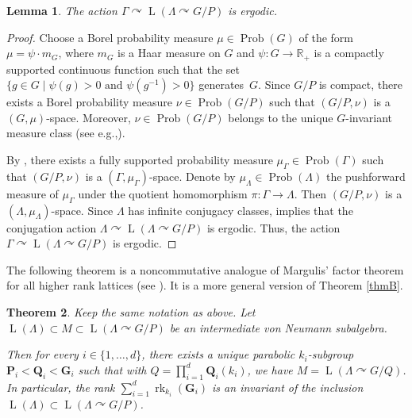 \documentclass[11pt]{article}
\newcommand{\eg}{e.g.,\xspace}
\newcommand{\bG}{\boldsymbol{G}}
\newcommand{\bP}{\boldsymbol{P}}
\newcommand{\bQ}{\boldsymbol{Q}}
\newtheorem{thm}{Theorem}[section]
\newtheorem{lem}[thm]{Lemma}
\theoremstyle{definition}
\newcommand{\R}{\mathbb{R}}
\DeclareMathOperator{\Prob}{Prob}
\DeclareMathOperator{\rk}{rk}
\DeclareMathOperator{\rL}{L}
\begin{document}
\begin{lem}\label{lem-conjugation}
The action $\Gamma \curvearrowright \rL(\Lambda \curvearrowright G/P)$ is ergodic.
\end{lem}

\begin{proof}
Choose a Borel probability measure $\mu \in \Prob(G)$ of the form $\mu = \psi \cdot m_G$, where $m_G$ is a Haar measure on $G$ and $\psi : G \to \R_+$ is a compactly supported continuous function such that the set $\{g \in G \mid \psi(g) > 0 \text{ and } \psi(g^{-1}) > 0\}$ generates~$G$. Since $G/P$ is compact, there exists a Borel probability measure $\nu \in \Prob(G/P)$ such that $(G/P, \nu)$ is a $(G, \mu)$-space. Moreover, $\nu\in \Prob(G/P)$ belongs to the unique $G$-invariant measure class (see \eg \cite[Lem.\,1.1]{NZ97}).

By \cite[Prop.\,VI.4.1]{Ma91}, there exists a fully supported probability measure $\mu_\Gamma \in \Prob(\Gamma)$ such that $(G/P, \nu)$ is a $(\Gamma, \mu_\Gamma)$-space. Denote by $\mu_\Lambda \in \Prob(\Lambda)$ the pushforward measure of $\mu_\Gamma$ under the quotient homomorphism $\pi : \Gamma \to \Lambda$. Then $(G/P, \nu)$ is a $(\Lambda, \mu_\Lambda)$-space. Since $\Lambda$ has infinite conjugacy classes, \cite[Lem.\,2.6]{KP21} implies that the conjugation action $\Lambda \curvearrowright \rL(\Lambda \curvearrowright G/P)$ is ergodic. Thus, the action $\Gamma \curvearrowright \rL(\Lambda \curvearrowright G/P)$ is ergodic.
\end{proof}

The following theorem is a noncommutative analogue of Margulis'\! factor theorem for all higher rank lattices (see \cite[Th.\,IV.2.11]{Ma91}). It is a more general version of Theorem \ref{thmB}.

\begin{thm}\label{thm-higher-rank}
Keep the same notation as above. Let $\rL(\Lambda) \subset M \subset \rL(\Lambda \curvearrowright G/P)$ be an intermediate von Neumann subalgebra.

Then for every $i \in \{1, \dots, d\}$, there exists a unique parabolic $k_i$-subgroup $\bP_i < \bQ_i < \bG_i$ such that with $Q = \prod_{i = 1}^d \bQ_i(k_i)$, we have $M = \rL(\Lambda \curvearrowright G/Q)$. In particular, the rank $\sum_{i = 1}^d \rk_{k_i}(\bG_i)$ is an invariant of the inclusion $\rL(\Lambda) \subset \rL(\Lambda \curvearrowright G/P)$.
\end{thm}
\end{document}
